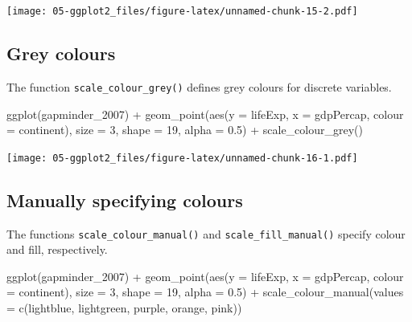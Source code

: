 \documentclass[
]{book}
\newenvironment{Shaded}{\begin{snugshade}}{\end{snugshade}}
\newcommand{\AttributeTok}[1]{\textcolor[rgb]{0.77,0.63,0.00}{#1}}
\newcommand{\DecValTok}[1]{\textcolor[rgb]{0.00,0.00,0.81}{#1}}
\newcommand{\FloatTok}[1]{\textcolor[rgb]{0.00,0.00,0.81}{#1}}
\newcommand{\FunctionTok}[1]{\textcolor[rgb]{0.00,0.00,0.00}{#1}}
\newcommand{\NormalTok}[1]{#1}
\newcommand{\SpecialCharTok}[1]{\textcolor[rgb]{0.00,0.00,0.00}{#1}}
\newcommand{\StringTok}[1]{\textcolor[rgb]{0.31,0.60,0.02}{#1}}
\begin{document}
\texttt{[image: 05-ggplot2\_files/figure-latex/unnamed-chunk-15-2.pdf]}

\hypertarget{grey-colours}{%
\subsection{Grey colours}\label{grey-colours}}

The function \texttt{scale\_colour\_grey()} defines grey colours for discrete variables.

\begin{Shaded}
\begin{Highlighting}[]
\FunctionTok{ggplot}\NormalTok{(gapminder\_2007) }\SpecialCharTok{+} 
  \FunctionTok{geom\_point}\NormalTok{(}\FunctionTok{aes}\NormalTok{(}\AttributeTok{y =}\NormalTok{ lifeExp, }\AttributeTok{x =}\NormalTok{ gdpPercap, }\AttributeTok{colour =}\NormalTok{ continent), }\AttributeTok{size =} \DecValTok{3}\NormalTok{, }
             \AttributeTok{shape =} \DecValTok{19}\NormalTok{, }\AttributeTok{alpha =} \FloatTok{0.5}\NormalTok{) }\SpecialCharTok{+}
  \FunctionTok{scale\_colour\_grey}\NormalTok{()}
\end{Highlighting}
\end{Shaded}

\texttt{[image: 05-ggplot2\_files/figure-latex/unnamed-chunk-16-1.pdf]}

\hypertarget{manually-specifying-colours}{%
\subsection{Manually specifying colours}\label{manually-specifying-colours}}

The functions \texttt{scale\_colour\_manual()} and \texttt{scale\_fill\_manual()} specify colour and fill, respectively.

\begin{Shaded}
\begin{Highlighting}[]
\FunctionTok{ggplot}\NormalTok{(gapminder\_2007) }\SpecialCharTok{+} 
  \FunctionTok{geom\_point}\NormalTok{(}\FunctionTok{aes}\NormalTok{(}\AttributeTok{y =}\NormalTok{ lifeExp, }\AttributeTok{x =}\NormalTok{ gdpPercap, }\AttributeTok{colour =}\NormalTok{ continent), }\AttributeTok{size =} \DecValTok{3}\NormalTok{, }
             \AttributeTok{shape =} \DecValTok{19}\NormalTok{, }\AttributeTok{alpha =} \FloatTok{0.5}\NormalTok{) }\SpecialCharTok{+}
  \FunctionTok{scale\_colour\_manual}\NormalTok{(}\AttributeTok{values =} \FunctionTok{c}\NormalTok{(}\StringTok{\textquotesingle{}lightblue\textquotesingle{}}\NormalTok{, }\StringTok{\textquotesingle{}lightgreen\textquotesingle{}}\NormalTok{, }\StringTok{\textquotesingle{}purple\textquotesingle{}}\NormalTok{, }\StringTok{\textquotesingle{}orange\textquotesingle{}}\NormalTok{, }\StringTok{\textquotesingle{}pink\textquotesingle{}}\NormalTok{))}
\end{Highlighting}
\end{Shaded}
\end{document}
